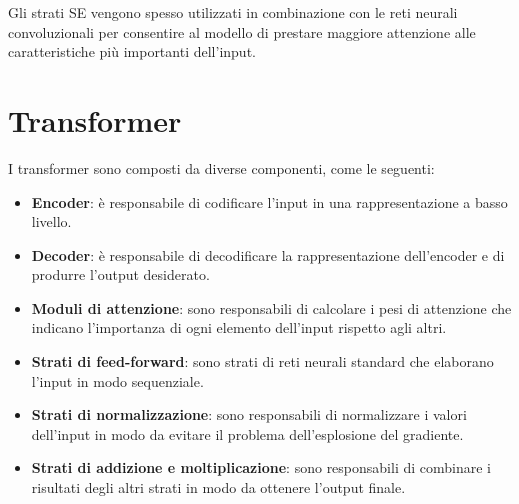\documentclass{article}
\begin{document}
Gli strati SE vengono spesso utilizzati in combinazione con le reti neurali convoluzionali per consentire al modello di prestare maggiore attenzione alle caratteristiche più importanti dell'input.


\section{Transformer}
I transformer sono composti da diverse componenti, come le seguenti:
\begin{itemize}
    \item \textbf{Encoder}: è responsabile di codificare l'input in una rappresentazione a basso livello.
    \item \textbf{Decoder}: è responsabile di decodificare la rappresentazione dell'encoder e di produrre l'output desiderato.
    \item \textbf{Moduli di attenzione}: sono responsabili di calcolare i pesi di attenzione che indicano l'importanza di ogni elemento dell'input rispetto agli altri.
    \item \textbf{Strati di feed-forward}: sono strati di reti neurali standard che elaborano l'input in modo sequenziale.
    \item \textbf{Strati di normalizzazione}: sono responsabili di normalizzare i valori dell'input in modo da evitare il problema dell'esplosione del gradiente.
    \item \textbf{Strati di addizione e moltiplicazione}: sono responsabili di combinare i risultati degli altri strati in modo da ottenere l'output finale.
\end{itemize}
\end{document}
